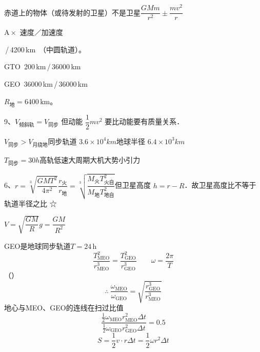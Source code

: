 赤道上的物体（或待发射的卫星）不是卫星\quad $\dfrac{GMm}{r^{2}}\pm\dfrac{mv^{2}}{r}$

A\,$\times$\ 速度／加速度



\,/\,4200\,km\ （中圆轨道）。

GTO\ 200\,km\,/\,36000\,km

GEO\ 36000\,km\,/\,36000\,km

$R_{\text{地}}=6400\,\mathrm{km}$。

9、$V_{\text{倾斜轨}}=V_{\text{同步}}$ 但动能 $\dfrac12mv^2$ 要比动能要有质量关系．%

$V_{\text{同步}}>V_{\text{月绕地}}$\quad 同步轨道 $3.6\times10^4\unit{km}$\quad 地球半径 $6.4\times10^3\unit{km}$

$T_{\text{同步}}=30\unit{h}$\quad 高轨低速大周期大机大势小引力%

6、$r=\sqrt[3]{\dfrac{GMT^2}{4\pi^2}}$\quad $\dfrac{r_{\text{火}}}{r_{\text{地}}}=\sqrt[3]{\dfrac{M_{\text{火}}T_{\text{火自}}^{2}}{M_{\text{地}}T_{\text{地自}}^{2}}}$\quad 但卫星高度 $h=r-R$．故卫星高度比不等于轨道半径之比 ☆%

$V=\sqrt{\dfrac{GM}{R}}$\quad\quad $g=\dfrac{GM}{R^2}$

GEO是地球同步轨道\quad $T=24\,\mathrm{h}$
\[
\frac{T_{\mathrm{MEO}}^2}{r_{\mathrm{MEO}}^3}=\frac{T_{\mathrm{GEO}}^2}{r_{\mathrm{GEO}}^3}\qquad \omega=\frac{2\pi}{T}
\]
（） %
\[
\therefore\ \frac{\omega_{\mathrm{MEO}}}{\omega_{\mathrm{GEO}}}=\sqrt{\frac{r_{\mathrm{GEO}}^3}{r_{\mathrm{MEO}}^3}}
\]
地心与MEO、GEO的连线在扫过比值 %
\[
\frac{\frac12\omega_{\mathrm{MEO}}r_{\mathrm{MEO}}^2\Delta t}{\frac12\omega_{\mathrm{GEO}}r_{\mathrm{GEO}}^2\Delta t}=0.5
\]
\[
S=\frac12v\cdot r\Delta t=\frac12\omega r^2\Delta t
\]

